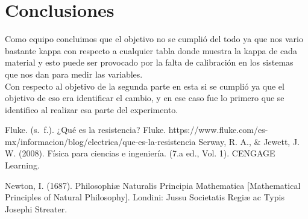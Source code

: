 \documentclass{article}
\begin{document}
\section{Conclusiones}\label{Conclusiones}				%
Como equipo concluimos que el objetivo no se cumplió del todo ya que nos vario bastante kappa con respecto a cualquier tabla donde muestra la kappa de cada material
y esto puede ser provocado por la falta de calibración en los sistemas que nos dan para medir las variables. 
\\
Con respecto al objetivo de la segunda parte en esta si se cumplió ya que el objetivo de eso era identificar el cambio, y en ese caso fue lo primero que se identifico 
al realizar esa parte del experimento.
\begin{thebibliography}{9}						%
	Fluke. (s. f.). ¿Qué es la resistencia? Fluke. https://www.fluke.com/es-mx/informacion/blog/electrica/que-es-la-resistencia
	Serway, R. A., $\&$ Jewett, J. W. (2008). Física para ciencias e ingeniería. (7.a
ed., Vol. 1). CENGAGE Learning.

	Newton, I. (1687). Philosophiæ Naturalis Principia Mathematica [Mathematical Principles of Natural Philosophy]. Londini: Jussu Societatis Regiæ ac Typis Josephi Streater.

\end{thebibliography}
\end{document}
